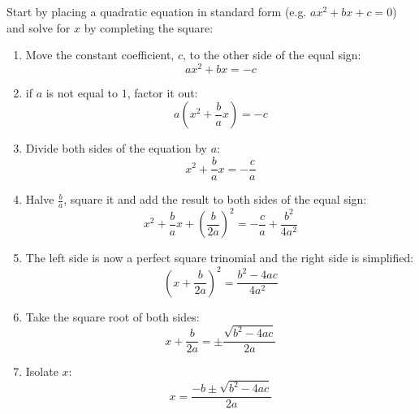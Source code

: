 \documentclass{amsart}
\begin{document}
\renewcommand{\headrulewidth}{0pt}
    \begin{large}
        Start by placing a quadratic equation in standard form (e.g. $ax^2+bx+c=0$) and solve for $x$ by completing the square:
        \begin{enumerate}
            \item Move the constant coefficient, $c$, to the other side of the equal sign: \[ax^2+bx=-c\]
            \item if $a$ is not equal to $1$, factor it out: \[a\left (x^2+\frac{b}{a}x\right )=-c\]
            \item Divide both sides of the equation by $a$: \[x^2+\frac{b}{a}x=-\frac{c}{a}\]
            \item Halve $\frac{b}{a}$, square it and add the result to both sides of the equal sign:
            \[x^2+\frac{b}{a}x+\left(\frac{b}{2a}\right)^2=-\frac{c}{a}+\frac{b^2}{4a^2}\]
            \item The left side is now a perfect square trinomial and the right side is simplified:
            \[\left (x+\frac{b}{2a}\right )^2=\frac{b^2-4ac}{4a^2}\]
            \item Take the square root of both sides:\[x+\frac{b}{2a}=\pm\frac{\sqrt{b^2-4ac}}{2a}\]
            \item Isolate $x$:\[x=\frac{-b\pm\sqrt{b^2-4ac}}{2a}\]
        \end{enumerate}
    \end{large}
\end{document}
